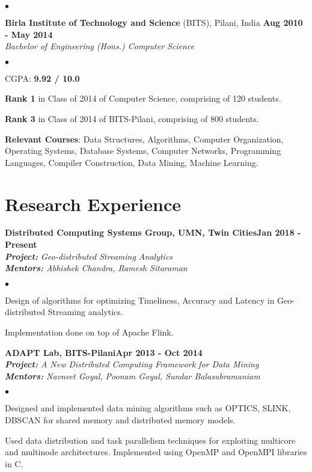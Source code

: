 \documentclass[margin,line]{res}
\newenvironment{list2}{
  \begin{list}{$\bullet$}{%
      \setlength{\itemsep}{0in}
      \setlength{\parsep}{0in} \setlength{\parskip}{0in}
      \setlength{\topsep}{0in} \setlength{\partopsep}{0in} 
      \setlength{\leftmargin}{0.2in}}}{\end{list}}
\begin{document}
\begin{resume}
\begin{list2}
\end{list2}
{\bf Birla Institute of Technology and Science} (BITS), Pilani, India \hfill {\bf {Aug 2010 - May 2014}}\\
{\em Bachelor of Engineering (Hons.) Computer Science }
\vspace*{.3cm}
\begin{list2}
\item CGPA:  {\bf {9.92 / 10.0}}
\item {\bf Rank 1} in Class of 2014 of Computer Science, comprising of 120 students. 
\item {\bf Rank 3} in Class of 2014 of BITS-Pilani, comprising of 800 students.
\item {\bf Relevant Courses}: Data Structures, Algorithms, Computer Organization, Operating Systems, Database Systems, Computer Networks, Programming Languages, Compiler Construction, Data Mining, Machine Learning.

\end{list2}


\section{\sc Research Experience}

{\bf Distributed Computing Systems Group, UMN, Twin Cities}\hfill {\bf Jan 2018 - Present}\\
{\em {\bf Project:} Geo-distributed Streaming Analytics} \\
{\em {\bf Mentors:} Abhishek Chandra, Ramesh Sitaraman}
\vspace{.3cm}
\begin{list2}
	\item Design of algorithms for optimizing Timeliness, Accuracy and Latency in Geo-distributed Streaming analytics.
	\item Implementation done on top of Apache Flink.
\end{list2}

{\bf ADAPT Lab, BITS-Pilani}\hfill {\bf Apr 2013 - Oct 2014}\\
{\em {\bf Project:} A New Distributed Computing Framework for Data Mining} \\
{\em {\bf Mentors:} Navneet Goyal, Poonam Goyal, Sundar Balasubramaniam}
\vspace{.3cm}
\begin{list2}
\item Designed and implemented data mining algorithms such as OPTICS, SLINK, DBSCAN for shared memory and
distributed memory models.
\item Used data distribution and task parallelism techniques for exploiting multicore and multinode
architectures. Implemented using OpenMP and OpenMPI libraries in C.
\end{list2}


\end{resume}
\end{document}
